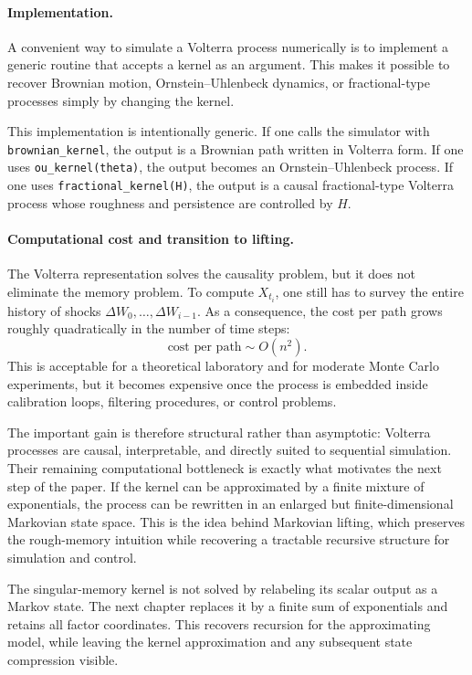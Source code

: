 \paragraph{Implementation.}

A convenient way to simulate a Volterra process numerically is to implement a generic routine that accepts a kernel as an argument. This makes it possible to recover Brownian motion, Ornstein--Uhlenbeck dynamics, or fractional-type processes simply by changing the kernel.

This implementation is intentionally generic. If one calls the simulator with \texttt{brownian\_kernel}, the output is a Brownian path written in Volterra form. If one uses \texttt{ou\_kernel(theta)}, the output becomes an Ornstein--Uhlenbeck process. If one uses \texttt{fractional\_kernel(H)}, the output is a causal fractional-type Volterra process whose roughness and persistence are controlled by \(H\).

\paragraph{Computational cost and transition to lifting.}

The Volterra representation solves the causality problem, but it does not eliminate the memory problem. To compute \(X_{t_i}\), one still has to survey the entire history of shocks \(\Delta W_0,\dots,\Delta W_{i-1}\). As a consequence, the cost per path grows roughly quadratically in the number of time steps:
\[
\text{cost per path} \sim O(n^2).
\]
This is acceptable for a theoretical laboratory and for moderate Monte Carlo experiments, but it becomes expensive once the process is embedded inside calibration loops, filtering procedures, or control problems.

The important gain is therefore structural rather than asymptotic: Volterra processes are causal, interpretable, and directly suited to sequential simulation. Their remaining computational bottleneck is exactly what motivates the next step of the paper. If the kernel can be approximated by a finite mixture of exponentials, the process can be rewritten in an enlarged but finite-dimensional Markovian state space. This is the idea behind Markovian lifting, which preserves the rough-memory intuition while recovering a tractable recursive structure for simulation and control.


The singular-memory kernel is not solved by relabeling its scalar output as a Markov state. The next chapter replaces it by a finite sum of exponentials and retains all factor coordinates. This recovers recursion for the approximating model, while leaving the kernel approximation and any subsequent state compression visible.
